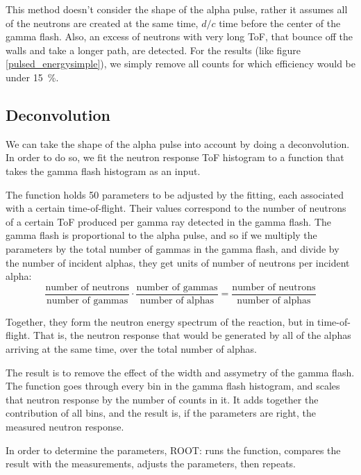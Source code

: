 \documentclass[a4paper,12pt]{report}
\begin{document}
This method doesn't consider the shape of the alpha pulse, rather it assumes all of the neutrons are created at the same time, $d/c$ time before the center of the gamma flash.
Also, an excess of neutrons with very long ToF, that bounce off the walls and take a longer path, are detected.
For the results (like figure \ref{pulsed_energysimple}), we simply remove all counts for which efficiency would be under \qty{15}{\percent}.

\subsection{Deconvolution}
We can take the shape of the alpha pulse into account by doing a deconvolution.
In order to do so, we fit the neutron response ToF histogram to a function that takes the gamma flash histogram as an input.

The function holds 50 parameters to be adjusted by the fitting, each associated with a certain time-of-flight.
Their values correspond to the number of neutrons of a certain ToF produced per gamma ray detected in the gamma flash.
The gamma flash is proportional to the alpha pulse, and so if we multiply the parameters by the total number of gammas in the gamma flash, and divide by the number of incident alphas, they get units of number of neutrons per incident alpha:
\begin{equation}
	\frac{\text{number of neutrons}}{\text{number of gammas}}\cdot \frac{\text{number of gammas}}{\text{number of alphas}} = \frac{\text{number of neutrons}}{\text{number of alphas}}
\end{equation}

Together, they form the neutron energy spectrum of the reaction, but in time-of-flight.
That is, the neutron response that would be generated by all of the alphas arriving at the same time, over the total number of alphas.

The result is to remove the effect of the width and assymetry of the gamma flash.
\\

The function goes through every bin in the gamma flash histogram, and scales that neutron response by the number of counts in it.
It adds together the contribution of all bins, and the result is, if the parameters are right, the measured neutron response.

In order to determine the parameters, ROOT: runs the function, compares the result with the measurements, adjusts the parameters, then repeats.
\end{document}
